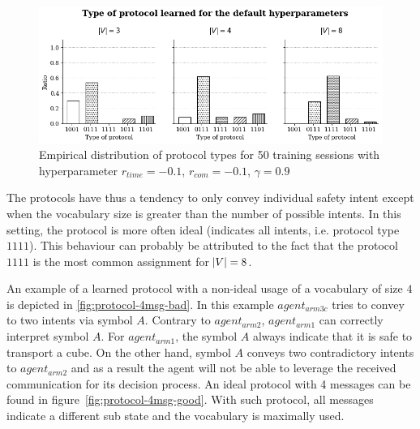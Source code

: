 \begin{figure}[H]
\centering
\includegraphics[width=\textwidth]{imgs/exp-2-complexity-default-comparison.png}
\caption[Empirical distribution of protocol types (default parameters)]{Empirical distribution of protocol types for 50 training sessions with hyperparameter $r_{time}=-0.1$, $r_{com}=-0.1$, $\gamma=0.9$}
\label{fig:exp-2-assigments}
\end{figure}

The protocols have thus a tendency to only convey individual safety intent except when the vocabulary size is greater than the number of possible intents. In this setting, the protocol is more often ideal (indicates all intents, i.e. protocol type $1111$). This behaviour can probably be attributed to the fact that the protocol $1111$ is the most common assignment for $\abs{V} = 8$.

An example of a learned protocol with a non-ideal usage of a vocabulary of size $4$ is depicted in \ref{fig:protocol-4msg-bad}. In this example $agent_{arm3c}$ tries to convey to two intents via symbol $A$. Contrary to $agent_{arm2}$, $agent_{arm1}$ can correctly interpret symbol $A$. For $agent_{arm1}$, the symbol $A$ always indicate that it is safe to transport a cube. On the other hand, symbol $A$ conveys two contradictory intents to $agent_{arm2}$ and as a result the agent will not be able to leverage the received communication for its decision process. An ideal protocol with 4 messages can be found in figure~\ref{fig:protocol-4msg-good}. With such protocol, all messages indicate a different sub state and the vocabulary is maximally used.

